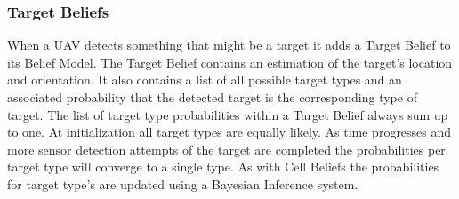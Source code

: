 


\subsubsection{Target Beliefs}
When a UAV detects something that might be a target it adds a Target Belief to its Belief Model.  The Target Belief contains an estimation of the target's location and orientation.  It also contains a list of all possible target types and an associated probability that the detected target is the corresponding type of target. The list of target type probabilities within a Target Belief always sum up to one.  At initialization all target types are equally likely.  As time progresses and more sensor detection attempts of the target are completed the probabilities per target type will converge to a single type.  As with Cell Beliefs the probabilities for target type's are updated using a Bayesian Inference system.  


